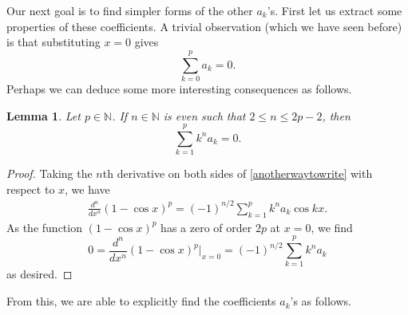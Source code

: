 \documentclass[12pt, reqno]{amsart}
\theoremstyle{plain}
\newtheorem{lemma}[theorem]{Lemma}
\theoremstyle{definition}
\begin{document}
Our next goal is to find simpler forms of the other $a_k$'s.  First let us extract some properties of these coefficients. A trivial observation (which we have seen before) is that substituting $x=0$ gives 
\begin{equation}\label{easy}
    \sum_{k=0}^pa_k=0.
\end{equation}
Perhaps we can deduce some more interesting consequences as follows.

\begin{lemma}\label{diffmanytimes}
Let $p\in\mathbb{N}$. If $n\in\mathbb{N}$ is even such that $2\le n\le 2p-2$, then
    \[\sum_{k=1}^pk^na_k=0.\]
\end{lemma}
\begin{proof}
    Taking the $n$th derivative on both sides of \eqref{anotherwaytowrite} with respect to $x$, we have
    \begin{align*}
        \frac{d^n}{dx^n}(1-\cos x)^p=(-1)^{n/2}\sum_{k=1}^pk^na_k\cos kx.
    \end{align*}
    As the function $(1-\cos x)^p$ has a zero of order $2p$ at $x=0$, we find
    \[0=\frac{d^n}{dx^n}(1-\cos x)^p\bigg|_{x=0}=(-1)^{n/2}\sum_{k=1}^pk^na_k\]
    as desired.
\end{proof}

From this, we are able to explicitly find the coefficients $a_k$'s as follows.
\end{document}
